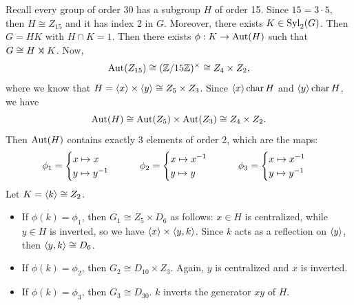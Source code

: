 \ex Recall every group of order 30 has a subgroup $H$ of order 15. Since $15 = 3 \cdot 5$, then $H \cong Z_{15}$ and it has index 2 in $G$. Moreover, there exists $K \in \syl_2(G)$. Then $G = HK$ with $H \cap K = 1$. Then there exists $\phi : K \to \aut(H)$ such that $G \cong H \semidir K$. Now,
\[\aut(Z_{15}) \cong \units[15] \cong Z_4 \times Z_2,\]
where we know that $H = \gen x \times \gen y \cong Z_5 \times Z_3$. Since $\gen x \cha H$ and $\gen y \cha H$, we have
\[\aut(H) \cong \aut(Z_5) \times \aut(Z_3) \cong Z_4 \times Z_2.\]
Then $\aut(H)$ contains exactly 3 elements of order 2, which are the maps:
\[\phi_1 = 
\begin{cases}
    x \mapsto x \\
    y \mapsto y\inv
\end{cases} \qquad
\phi_2 =
\begin{cases}
    x \mapsto x\inv \\
    y \mapsto y
\end{cases} \qquad
\phi_3 =
\begin{cases}
    x \mapsto x\inv \\
    y \mapsto y\inv
\end{cases}\]
Let $K = \gen k \cong Z_2$.
\begin{itemize}
    \item If $\phi(k) = \phi_1$, then $G_1 \cong Z_5 \times D_6$ as follows: $x \in H$ is centralized, while $y \in H$ is inverted, so we have $\gen x \times \gen{y, k}$. Since $k$ acts as a reflection on $\gen y$, then $\gen{y, k} \cong D_6$.
    \item If $\phi(k) = \phi_2$, then $G_2 \cong D_{10} \times Z_3$. Again, $y$ is centralized and $x$ is inverted.
    \item If $\phi(k) = \phi_3$, then $G_3 \cong D_{30}$. $k$ inverts the generator $xy$ of $H$.
\end{itemize}

